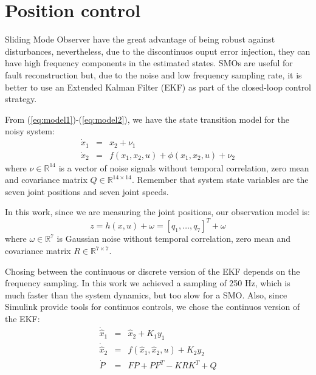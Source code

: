 \documentclass[smallextended]{svjour3}       %
\begin{document}
\section{Position control}
\label{sec:Control}
Sliding Mode Observer have the great advantage of being robust against disturbances, nevertheless, due to the discontinuos ouput error injection, they can have high frequency components in the estimated states. SMOs are useful for fault reconstruction but, due to the noise and low frequency sampling rate, it is better to use an Extended Kalman Filter (EKF) as part of the closed-loop control strategy.

From (\ref{eq:model1})-(\ref{eq:model2}), we have the state transition model for the noisy system:
\begin{eqnarray}
    \dot{x}_1 &=& x_2 + \nu_1\label{eq:noisymodel1}\\
    \dot{x}_2 &=& f(x_1, x_2, u) + \phi(x_1, x_2, u) + \nu_2\label{eq:noisymodel2}
\end{eqnarray}
where $\nu \in\mathbb{R}^14$ is a vector of noise signals without temporal correlation, zero mean and covariance matrix $Q\in\mathbb{R}^{14\times 14}$. Remember that system state variables are the seven joint positions and seven joint speeds.

In this work, since we are measuring the joint positions, our observation model is:
\begin{equation}
  z = h(x,u) + \omega = [q_1,\dots,q_7]^T + \omega
  \label{eq:obsmodel}
\end{equation}
where $\omega\in\mathbb{R}^7$ is Gaussian noise without temporal correlation, zero mean and covariance matrix $R\in\mathbb{R}^{7\times 7}$.

Chosing between the continuous or discrete version of the EKF depends on the frequency sampling. In this work we achieved a sampling of 250 Hz, which is much faster than the system dynamics, but too slow for a SMO. Also, since Simulink provide tools for continuos controls, we chose the continuos version of the EKF:
\begin{eqnarray}
  \dot{\hat{x}}_1 &=& \hat{x}_2 + K_1 y_1 \label{eq:ekf1}\\
  \dot{\hat{x}}_2 &=& f(\hat{x}_1, \hat{x}_2, u) + K_2 y_2\label{eq:ekf2}\\
  \dot{P} &=& FP + PF^T - KRK^T + Q\label{eq:ekf3}
\end{eqnarray}
\end{document}
